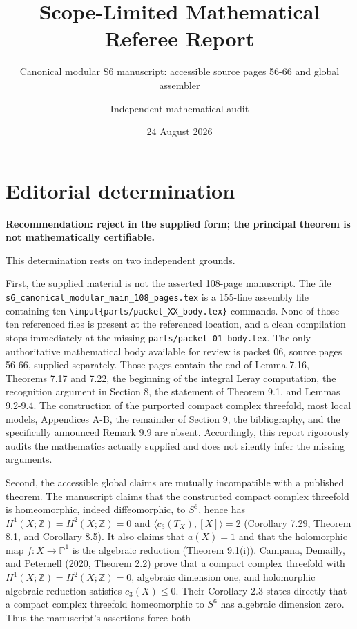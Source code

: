 \documentclass[
  10pt,
]{article}
\title{Scope-Limited Mathematical Referee Report}
\subtitle{Canonical modular S6 manuscript: accessible source pages 56-66
and global assembler}
\author{Independent mathematical audit}
\date{24 August 2026}
\begin{document}
\maketitle

{
\hypersetup{linkcolor=}
\setcounter{tocdepth}{3}
\tableofcontents
}
\section{Editorial determination}\label{editorial-determination}

\textbf{Recommendation: reject in the supplied form; the principal
theorem is not mathematically certifiable.}

This determination rests on two independent grounds.

First, the supplied material is not the asserted 108-page manuscript.
The file \texttt{s6\_canonical\_modular\_main\_108\_pages.tex} is a
155-line assembly file containing ten
\texttt{\textbackslash{}input\{parts/packet\_XX\_body.tex\}} commands.
None of those ten referenced files is present at the referenced
location, and a clean compilation stops immediately at the missing
\texttt{parts/packet\_01\_body.tex}. The only authoritative mathematical
body available for review is packet 06, source pages 56-66, supplied
separately. Those pages contain the end of Lemma 7.16, Theorems 7.17 and
7.22, the beginning of the integral Leray computation, the recognition
argument in Section 8, the statement of Theorem 9.1, and Lemmas 9.2-9.4.
The construction of the purported compact complex threefold, most local
models, Appendices A-B, the remainder of Section 9, the bibliography,
and the specifically announced Remark 9.9 are absent. Accordingly, this
report rigorously audits the mathematics actually supplied and does not
silently infer the missing arguments.

Second, the accessible global claims are mutually incompatible with a
published theorem. The manuscript claims that the constructed compact
complex threefold is homeomorphic, indeed diffeomorphic, to \(S^6\),
hence has \(H^1(X;\mathbb Z)=H^2(X;\mathbb Z)=0\) and
\(\langle c_3(T_X),[X]\rangle=2\) (Corollary 7.29, Theorem 8.1, and
Corollary 8.5). It also claims that \(a(X)=1\) and that the holomorphic
map \(f:X\to\mathbb P^1\) is the algebraic reduction (Theorem 9.1(i)).
Campana, Demailly, and Peternell (2020, Theorem 2.2) prove that a
compact complex threefold with \(H^1(X;\mathbb Z)=H^2(X;\mathbb Z)=0\),
algebraic dimension one, and holomorphic algebraic reduction satisfies
\(c_3(X)\le 0\). Their Corollary 2.3 states directly that a compact
complex threefold homeomorphic to \(S^6\) has algebraic dimension zero.
Thus the manuscript's assertions force both
\end{document}
